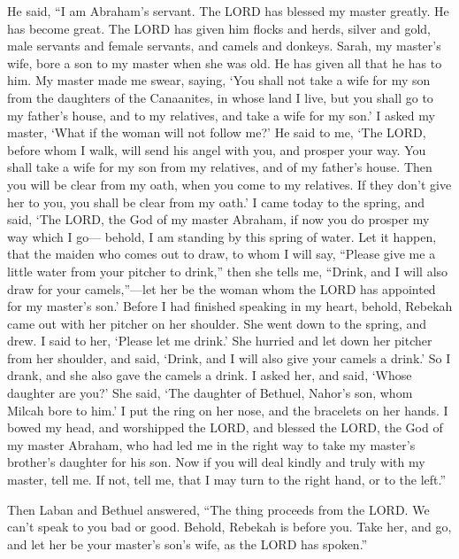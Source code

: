  He said, ``I am Abraham's servant.  The
LORD has blessed my master greatly. He has become great. The LORD has
given him flocks and herds, silver and gold, male servants and female
servants, and camels and donkeys.  Sarah, my master's
wife, bore a son to my master when she was old. He has given all that he
has to him.  My master made me swear, saying, `You shall
not take a wife for my son from the daughters of the Canaanites, in
whose land I live,  but you shall go to my father's
house, and to my relatives, and take a wife for my son.' 
I asked my master, `What if the woman will not follow me?'
 He said to me, `The LORD, before whom I walk, will send
his angel with you, and prosper your way. You shall take a wife for my
son from my relatives, and of my father's house.  Then
you will be clear from my oath, when you come to my relatives. If they
don't give her to you, you shall be clear from my oath.' 
I came today to the spring, and said, `The LORD, the God of my master
Abraham, if now you do prosper my way which I go--- 
behold, I am standing by this spring of water. Let it happen, that the
maiden who comes out to draw, to whom I will say, ``Please give me a
little water from your pitcher to drink,''  then she
tells me, ``Drink, and I will also draw for your camels,''---let her be
the woman whom the LORD has appointed for my master's son.'
 Before I had finished speaking in my heart, behold,
Rebekah came out with her pitcher on her shoulder. She went down to the
spring, and drew. I said to her, `Please let me drink.' 
She hurried and let down her pitcher from her shoulder, and said,
`Drink, and I will also give your camels a drink.' So I drank, and she
also gave the camels a drink.  I asked her, and said,
`Whose daughter are you?' She said, `The daughter of Bethuel, Nahor's
son, whom Milcah bore to him.' I put the ring on her nose, and the
bracelets on her hands.  I bowed my head, and worshipped
the LORD, and blessed the LORD, the God of my master Abraham, who had
led me in the right way to take my master's brother's daughter for his
son.  Now if you will deal kindly and truly with my
master, tell me. If not, tell me, that I may turn to the right hand, or
to the left.''

 Then Laban and Bethuel answered, ``The thing proceeds
from the LORD. We can't speak to you bad or good. 
Behold, Rebekah is before you. Take her, and go, and let her be your
master's son's wife, as the LORD has spoken.''


